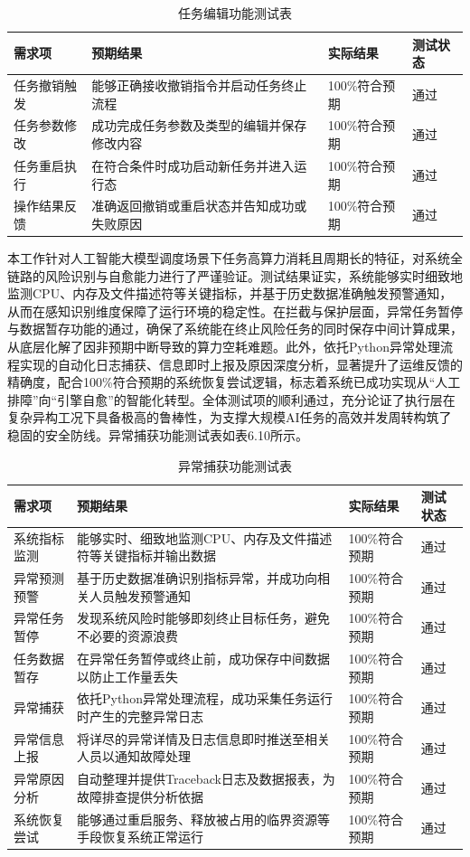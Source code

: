 \begin{table}[htbp]
\centering
\caption{任务编辑功能测试表}
\begin{tabularx}{\textwidth}{lXll}
\toprule
\textbf{需求项} & \textbf{预期结果} & \textbf{实际结果} & \textbf{测试状态} \\
\midrule
任务撤销触发 & 能够正确接收撤销指令并启动任务终止流程 & 100\%符合预期 & 通过  \\
任务参数修改 & 成功完成任务参数及类型的编辑并保存修改内容 & 100\%符合预期 & 通过  \\
任务重启执行 & 在符合条件时成功启动新任务并进入运行态 & 100\%符合预期 & 通过  \\
操作结果反馈 & 准确返回撤销或重启状态并告知成功或失败原因 & 100\%符合预期 & 通过  \\
\bottomrule
\end{tabularx}
\end{table}

本工作针对人工智能大模型调度场景下任务高算力消耗且周期长的特征，对系统全链路的风险识别与自愈能力进行了严谨验证。测试结果证实，系统能够实时细致地监测CPU、内存及文件描述符等关键指标，并基于历史数据准确触发预警通知，从而在感知识别维度保障了运行环境的稳定性。在拦截与保护层面，异常任务暂停与数据暂存功能的通过，确保了系统能在终止风险任务的同时保存中间计算成果，从底层化解了因非预期中断导致的算力空耗难题。此外，依托Python异常处理流程实现的自动化日志捕获、信息即时上报及原因深度分析，显著提升了运维反馈的精确度，配合100\%符合预期的系统恢复尝试逻辑，标志着系统已成功实现从“人工排障”向“引擎自愈”的智能化转型。全体测试项的顺利通过，充分论证了执行层在复杂异构工况下具备极高的鲁棒性，为支撑大规模AI任务的高效并发周转构筑了稳固的安全防线。异常捕获功能测试表如表6.10所示。

\begin{table}[htbp]
\centering
\caption{异常捕获功能测试表}
\begin{tabularx}{\textwidth}{lXll}
\toprule
\textbf{需求项} & \textbf{预期结果} & \textbf{实际结果} & \textbf{测试状态} \\
\midrule
系统指标监测 & 能够实时、细致地监测CPU、内存及文件描述符等关键指标并输出数据 & 100\%符合预期 & 通过  \\
异常预测预警 & 基于历史数据准确识别指标异常，并成功向相关人员触发预警通知 & 100\%符合预期 & 通过  \\
异常任务暂停 & 发现系统风险时能够即刻终止目标任务，避免不必要的资源浪费 & 100\%符合预期 & 通过  \\
任务数据暂存 & 在异常任务暂停或终止前，成功保存中间数据以防止工作量丢失 & 100\%符合预期 & 通过  \\
异常捕获 & 依托Python异常处理流程，成功采集任务运行时产生的完整异常日志 & 100\%符合预期 & 通过  \\
异常信息上报 & 将详尽的异常详情及日志信息即时推送至相关人员以通知故障处理 & 100\%符合预期 & 通过  \\
异常原因分析 & 自动整理并提供Traceback日志及数据报表，为故障排查提供分析依据 & 100\%符合预期 & 通过  \\
系统恢复尝试 & 能够通过重启服务、释放被占用的临界资源等手段恢复系统正常运行 & 100\%符合预期 & 通过  \\
\bottomrule
\end{tabularx}
\end{table}

